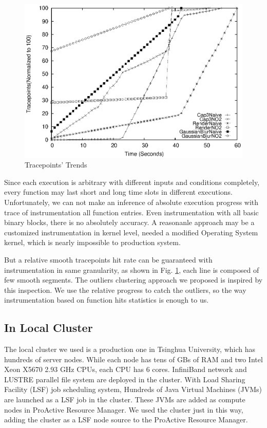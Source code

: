 \begin{figure}
\centering
\includegraphics[width=0.9\columnwidth]{figures/tracepoints_all_vs_sampling.eps}
\caption{Tracepoints' Trends}
\label{figure:tracepoints}
\end{figure}

Since each execution is arbitrary with different inputs and conditions completely, every function may last short and long time slots in different executions. Unfortunately, we can not make an inference of absolute execution progress with  trace of instrumentation all function entries. Even instrumentation with all basic binary blocks, there is no absolutely accuracy. A reasonanle approach may be a customized instrumentation in kernel level, needed a modified Operating System kernel, which is nearly impossible to production system.

But a relative smooth tracepoints hit rate can be guaranteed with instrumentation in same granularity, as shown in Fig.  \ref{figure:tracepoints}, each line is composed of few smooth segments. The outliers clustering approach we proposed is inspired by this inspection. We use the relative progress to catch the outliers, so the way instrumentation based on function hits statistics is enough to us.

\subsection{In Local Cluster}

The local cluster we used is a production one in Tsinghua University, which has hundreds of  server nodes. While each node has tens of GBs of RAM and two Intel Xeon X5670 2.93 GHz CPUs, each CPU has 6 cores. InfiniBand network and LUSTRE parallel file system are deployed in the cluster. With Load Sharing Facility (LSF) job scheduling system, Hundreds of Java Virtual Machines (JVMs) are launched as a LSF job in the cluster. These JVMs are added as compute nodes in ProActive Resource Manager. We used the cluster just in this way, adding the cluster as a LSF node source to the ProActive Resource Manager.

